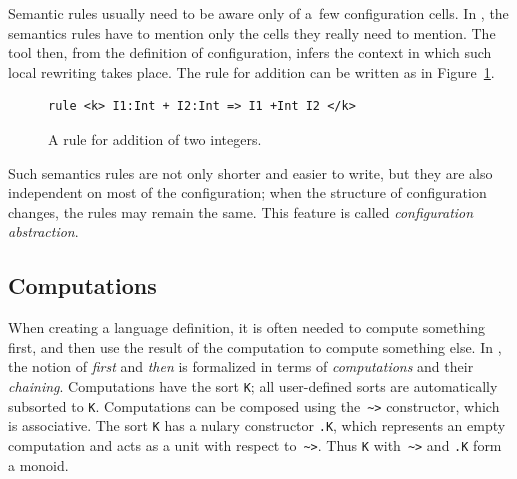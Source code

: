 \documentclass{fithesis3}
\begin{document}
Semantic rules usually need to be aware only of a~few configuration cells. In \K, the semantics rules have to mention only the cells they really need to mention. The \K tool then, from the definition of configuration, infers the context in which such local rewriting takes place. The rule for addition can be written as in Figure~\ref{ruleAddInKCell}.
\begin{figure}
\begin{lstlisting}
rule <k> I1:Int + I2:Int => I1 +Int I2 </k>
\end{lstlisting}
\caption{A rule for addition of two integers.}
\label{ruleAddInKCell}
\end{figure}
Such semantics rules are not only shorter and easier to write, but they are also independent on most of the configuration; when the structure of configuration changes, the rules may remain the same. This feature is called \textit{configuration abstraction}.


\subsection{Computations}
When creating a language definition, it is often needed to compute something first, and then use the result of the computation to compute something else. In \K, the notion of \textit{first} and \textit{then} is formalized in terms of \textit{computations} and their \textit{chaining}. Computations have the sort \texttt{K}; all user-defined sorts are automatically subsorted to \texttt{K}. Computations can be composed using the~\lstinline{~>}{} constructor, which is associative. The sort \texttt{K} has a nulary constructor \texttt{.K}, which represents an empty computation and acts as a unit with respect to~\lstinline{~>}{}. Thus \texttt{K} with~\lstinline{~>}{} and \texttt{.K} form a monoid.
\end{document}
